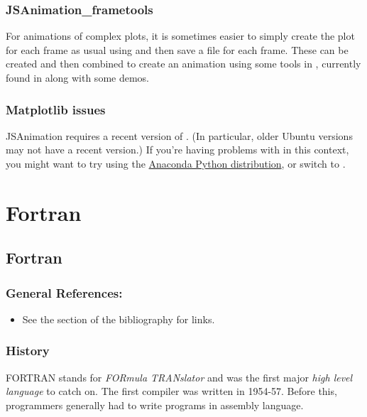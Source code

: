 \documentclass[letterpaper,10pt,english]{sphinxmanual}
\begin{document}
\subsection{JSAnimation\_frametools}
\label{animation:jsanimation-frametools}
For animations of complex plots, it is sometimes easier to simply
create the plot for each frame as usual using  and then
save a  file for each frame.  These can be created and then
combined to create an animation using some tools in
, currently found in {\hyperref[labs/lab15:lab15]{}} along
with some demos.


\subsection{Matplotlib issues}
\label{animation:matplotlib-issues}
JSAnimation requires a recent version of .
(In particular, older Ubuntu versions may not have a recent version.)
If you're having problems with  in this context, you might
want to try using the \href{https://store.continuum.io/cshop/anaconda}{Anaconda Python distribution}, or switch to .


\chapter{Fortran}
\label{index:toc-fortran}\label{index:fortran}

\section{Fortran}
\label{fortran:fortran}\label{fortran::doc}\label{fortran:id1}

\subsection{General References:}
\label{fortran:general-references}\begin{itemize}
\item {} 
See the {\hyperref[biblio:biblio\string-fortran]{}} section of the bibliography for links.

\end{itemize}


\subsection{History}
\label{fortran:history}
FORTRAN stands for \emph{FORmula TRANslator} and was the first major \emph{high
level language} to catch on.  The first compiler was written in
1954-57.  Before this, programmers generally had to write programs in
assembly language.
\end{document}
